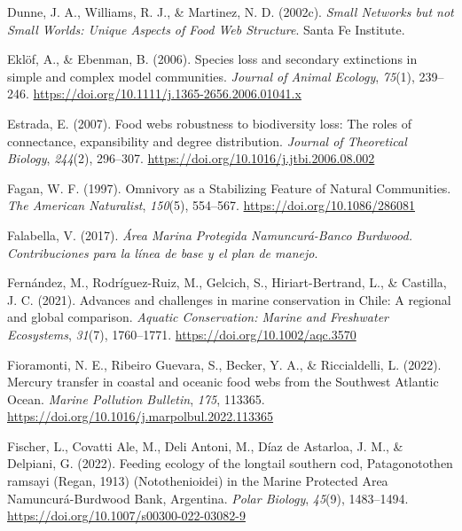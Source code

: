 \documentclass[preprint, 3p,
authoryear]{elsarticle} %
\newlength{\cslhangindent}
\newlength{\cslentryspacingunit} %
\newenvironment{CSLReferences}[2] %
 {%
  \setlength{\parindent}{0pt}
  \ifodd #1
  \let\oldpar\par
  \def\par{\hangindent=\cslhangindent\oldpar}
  \fi
  \setlength{\parskip}{#2\cslentryspacingunit}
 }%
 {}
\begin{document}
\begin{CSLReferences}{1}{0}
\leavevmode{}%
Dunne, J. A., Williams, R. J., \& Martinez, N. D. (2002c). \emph{Small
{Networks} but not {Small Worlds}: {Unique Aspects} of {Food Web
Structure}}. {Santa Fe Institute}.

\leavevmode{}%
Eklöf, A., \& Ebenman, B. (2006). Species loss and secondary extinctions
in simple and complex model communities. \emph{Journal of Animal
Ecology}, \emph{75}(1), 239--246.
\url{https://doi.org/10.1111/j.1365-2656.2006.01041.x}

\leavevmode{}%
Estrada, E. (2007). Food webs robustness to biodiversity loss: {The}
roles of connectance, expansibility and degree distribution.
\emph{Journal of Theoretical Biology}, \emph{244}(2), 296--307.
\url{https://doi.org/10.1016/j.jtbi.2006.08.002}

\leavevmode{}%
Fagan, W. F. (1997). Omnivory as a {Stabilizing Feature} of {Natural
Communities}. \emph{The American Naturalist}, \emph{150}(5), 554--567.
\url{https://doi.org/10.1086/286081}

\leavevmode{}%
Falabella, V. (2017). \emph{Área {Marina Protegida Namuncurá-Banco
Burdwood}. {Contribuciones} para la línea de base y el plan de manejo}.

\leavevmode{}%
Fernández, M., Rodríguez-Ruiz, M., Gelcich, S., Hiriart-Bertrand, L., \&
Castilla, J. C. (2021). Advances and challenges in marine conservation
in {Chile}: {A} regional and global comparison. \emph{Aquatic
Conservation: Marine and Freshwater Ecosystems}, \emph{31}(7),
1760--1771. \url{https://doi.org/10.1002/aqc.3570}

\leavevmode{}%
Fioramonti, N. E., Ribeiro Guevara, S., Becker, Y. A., \& Riccialdelli,
L. (2022). Mercury transfer in coastal and oceanic food webs from the
{Southwest Atlantic Ocean}. \emph{Marine Pollution Bulletin},
\emph{175}, 113365.
\url{https://doi.org/10.1016/j.marpolbul.2022.113365}

\leavevmode{}%
Fischer, L., Covatti Ale, M., Deli Antoni, M., Díaz de Astarloa, J. M.,
\& Delpiani, G. (2022). Feeding ecology of the longtail southern cod,
{Patagonotothen} ramsayi ({Regan}, 1913) ({Notothenioidei}) in the
{Marine Protected Area Namuncurá-Burdwood Bank}, {Argentina}.
\emph{Polar Biology}, \emph{45}(9), 1483--1494.
\url{https://doi.org/10.1007/s00300-022-03082-9}


\end{CSLReferences}
\end{document}
